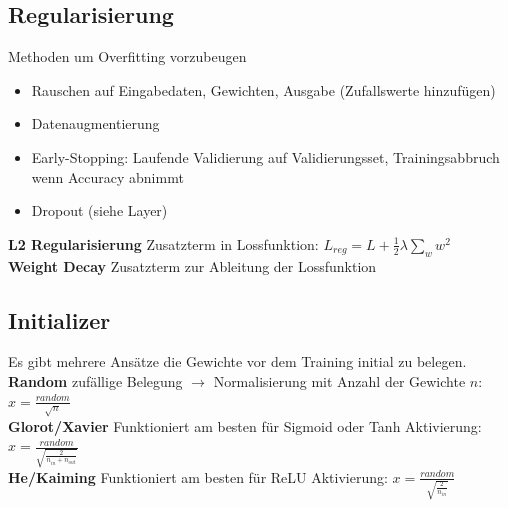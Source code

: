 \documentclass[12pt]{article}
\begin{document}
	\subsection{Regularisierung}
	Methoden um Overfitting vorzubeugen
	\begin{itemize}
		\item Rauschen auf Eingabedaten, Gewichten, Ausgabe (Zufallswerte hinzufügen)
		\item Datenaugmentierung
		\item Early-Stopping: Laufende Validierung auf Validierungsset, Trainingsabbruch wenn Accuracy abnimmt
		\item Dropout (siehe Layer)
	\end{itemize}
	\textbf{L2 Regularisierung} Zusatzterm in Lossfunktion: $L_{reg} = L + \frac{1}{2} \lambda \sum_w w^2$\\
	\textbf{Weight Decay} Zusatzterm zur Ableitung der Lossfunktion

	\subsection{Initializer}
	Es gibt mehrere Ansätze die Gewichte vor dem Training initial zu belegen.\\
	\textbf{Random} zufällige Belegung $\rightarrow$ Normalisierung mit Anzahl der Gewichte $n$: $x = \frac{random}{\sqrt{n}}$\\
	\textbf{Glorot/Xavier} Funktioniert am besten für Sigmoid oder Tanh Aktivierung: $x = \frac{random}{\sqrt{\frac{2}{n_{in} + n_{out}}}}$\\
	\textbf{He/Kaiming} Funktioniert am besten für ReLU Aktivierung: $x = \frac{random}{\sqrt{\frac{2}{n_{in}}}}$\\
\end{document}
